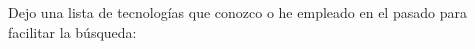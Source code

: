 \documentclass[9pt]{developercv} %
\begin{document}
\newpage



Dejo una lista de tecnologías que conozco o he empleado en el pasado para facilitar la búsqueda:\\
\end{document}

